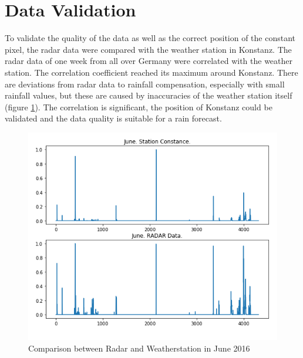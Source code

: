 \documentclass[oneside]{htwg-report}
\begin{document}
\section*{Data Validation}\label{data validation}
\begin{sloppypar}
To validate the quality of the data as well as the correct position of the constant pixel, the radar data were compared with the weather station in Konstanz.
The radar data of one week from all over Germany were correlated with the weather station.
The correlation coefficient reached its maximum around Konstanz.
There are deviations from radar data to rainfall compensation, especially with small rainfall values, but these are caused by inaccuracies of the weather station itself (figure \ref{fig:radar_station_daten_vergleich_June}).
The correlation is significant, the position of Konstanz could be validated and the data quality is suitable for a rain forecast.
\end{sloppypar}

\begin{figure}[ht]
    \centering
    \includegraphics[width=1\linewidth,angle=0]{../abb/radar_station_daten_vergleich_June.png}
    \caption[Datenaufbereitung]{Comparison between Radar and Weatherstation in June 2016}
    \label{fig:radar_station_daten_vergleich_June}
\end{figure}
\end{document}
